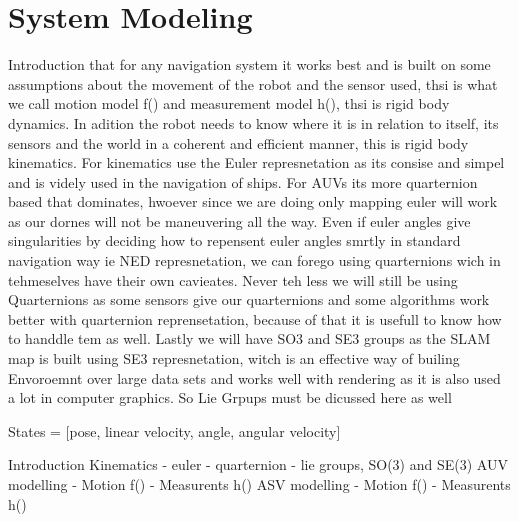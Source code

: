 \section{System Modeling}

Introduction that for any navigation system it works best and is built on some assumptions about the movement of the robot and the sensor used, thsi is what we call motion model f() and measurement model h(), thsi is rigid body dynamics. In adition the robot needs to know where it is in relation to itself, its sensors and the world in a coherent and efficient manner, this is rigid body kinematics.
For kinematics use the Euler represnetation as its consise and simpel and is videly used in the navigation of ships. For AUVs its more quarternion based that dominates, hwoever since we are doing only mapping euler will work as our dornes will not be maneuvering all the way. 
Even if euler angles give singularities by deciding how to repensent euler angles smrtly in standard navigation way ie NED represnetation, we can forego using quarternions wich in tehmeselves have their own cavieates. 
Never teh less we will still be using Quarternions as some sensors give our quarternions and some algorithms work better with quarternion reprensetation, because of that it is usefull to know how to handdle tem as well.
Lastly we will have SO3 and SE3 groups as the SLAM map is built using SE3 represnetation, witch is an effective way of builing Envoroemnt over large data sets and works well with rendering as it is also used a lot in computer graphics. So Lie Grpups must be dicussed here as well 

States = [pose, linear velocity, angle, angular velocity]

Introduction
Kinematics 
- euler
- quarternion
- lie groups, SO(3) and SE(3)
AUV modelling
- Motion f()
- Measurents h()
ASV modelling
- Motion f()
- Measurents h()

